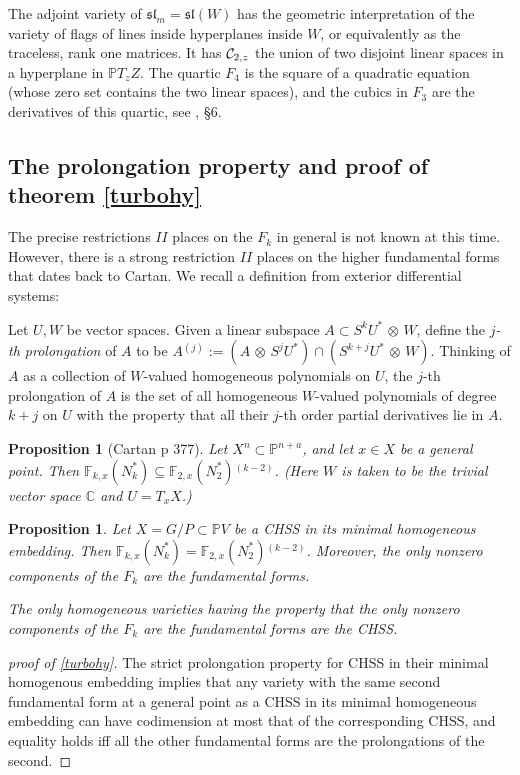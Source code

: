 \documentclass[11pt]{amsart}
\newtheorem{proposition}[theorem]{Proposition}
\theoremstyle{definition}
\theoremstyle{remark}
\numberwithin{equation}{section}
\def\BC{\mathbb C}\def\BF{\mathbb F}\def\BO{\mathbb O}\def\BS{\mathbb S}
\def\BP{\mathbb P}
\def\pp#1{\mathbb P^{#1}}
\def\pp#1{{\mathbb P}^{#1}}
\def\FF{\mathbb F}
\def\fsl{{\mathfrak {sl}}}
\def\up#1{{}^{({#1})}}
\def\ot{{\mathord{\,\otimes }\,}}
\begin{document}
The adjoint variety of $\fsl_m=\fsl(W)$ has the geometric interpretation of the variety of
flags of lines inside hyperplanes inside $W$, or equivalently as the traceless, rank one
matrices. It has ${\mathcal C}_{2,z}$ the union of two disjoint linear spaces in a hyperplane
in $\BP T_zZ$. The quartic $F_4$ is the square of  a quadratic
equation (whose zero set contains the two linear spaces), and the cubics
in $F_3$ are the derivatives of this quartic, see \cite{LM1}, \S 6.


\subsection{The prolongation property and proof of  theorem \ref{turbohy}}
The  precise restrictions $II$ places on the $F_k$ in general is not  known at this time.
However,  there is
a strong restriction $II$ places on the higher fundamental forms
that dates back to Cartan.
We recall a definition from exterior differential systems:

\medskip

Let $U,W$ be vector spaces. Given a linear subspace
$A\subset S^kU^*\ot W$, define the {\it $j$-th prolongation} of
$A$ to be $A\up j:=(A\ot S^jU^*)\cap (S^{k+j}U^*\ot W)$. Thinking
of $A$ as a collection of $W$-valued homogeneous polynomials on $U$, the
$j$-th prolongation of $A$ is the set of all
homogeneous $W$-valued polynomials of degree
$k+j$ on $U$ with the property that all their $j$-th order partial derivatives
lie in $A$.

\begin{proposition}[Cartan \cite{C1919} p 377] Let $X^n\subset \pp{n+a}$, and let
$x\in X$ be a general point. Then
$\FF_{k,x}(N_k^*)\subseteq \FF_{2,x}(N_2^*)\up{k-2}$. (Here
$W$ is taken to be the trivial vector space $\BC$ and $U=T_xX$.)
\end{proposition}


 

\begin{proposition}\cite{LM0} Let $X=G/P\subset \BP V$ be
a CHSS in  its minimal homogeneous embedding. Then 
$\FF_{k,x}(N_k^*)= \FF_{2,x}(N_2^*)\up{k-2}$.
Moreover, the only nonzero components of the $F_k$ are
the fundamental forms.

The only homogeneous varieties having the property that
the only nonzero components of the $F_k$ are
the fundamental forms are the CHSS.
\end{proposition}


\begin{proof}[proof of \ref{turbohy}] The strict prolongation property
for CHSS in their minimal homogenous embedding implies that any variety
with the same second fundamental form at a general point as a CHSS in its minimal homogeneous
embedding can have codimension at most that of the corresponding CHSS, and
equality holds iff all the other fundamental forms are the prolongations
of the second.
\end{proof}
 
\end{document}
